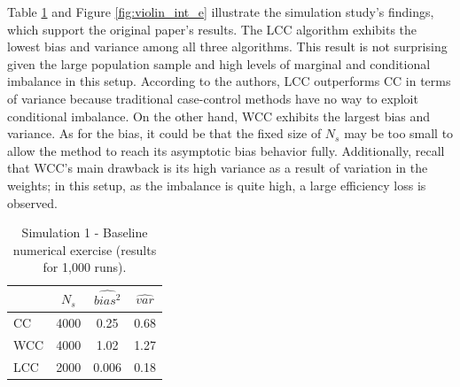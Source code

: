
Table \ref{tab:sim1} and Figure \ref{fig:violin_int_e} illustrate the simulation study's findings, which support the original paper's results. The LCC algorithm exhibits the lowest bias and variance among all three algorithms. This result is not surprising given the large population sample and high levels of marginal and conditional imbalance in this setup. According to the authors, LCC outperforms CC in terms of variance because traditional case-control methods have no way to exploit conditional imbalance. On the other hand, WCC exhibits the largest bias and variance. As for the bias, it could be that the fixed size of $N_s$ may be too small to allow the method to reach its asymptotic bias behavior fully. Additionally, recall that WCC's main drawback is its high variance as a result of variation in the weights; in this setup, as the imbalance is quite high, a large efficiency loss is observed.

\begin{table}[ht]
    \centering
    \begin{tabular}{lccc}\toprule
        & \multicolumn{1}{c}{$N_s$} & \multicolumn{1}{c}{$\widehat{bias^2}$} & \multicolumn{1}{c}{$\widehat{var}$}
        \\\midrule
        CC  & 4000 & 0.25  & 0.68 \\
        WCC & 4000 & 1.02 & 1.27 \\
        LCC & 2000 & 0.006 & 0.18 \\
        \bottomrule
    \end{tabular}
    \caption[Simulation 1 - Baseline numerical exercise]{Simulation 1 - Baseline numerical exercise (results for 1,000 runs).}
    \label{tab:sim1}
\end{table}


